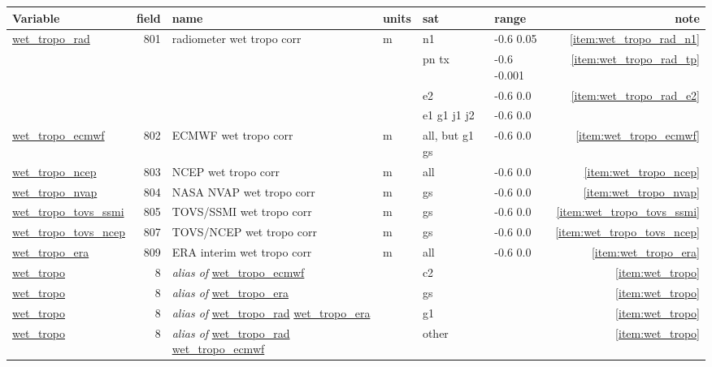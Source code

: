 \documentclass[a4paper,11pt,openany,natbib]{thesis}
\makeatletter
\newcommand\var[1]{\url{#1}\index{variables!#1@\protect\url{#1}}}
\newcommand\alias[1]{\emph{alias of} \var{#1}}
\newenvironment{vartable}{
\begin{table}[ht]
\small
\begin{tabular}{lrllllr}
\hline
Variable & field & name & units & sat & range & note \\
\hline
}{
\hline
\end{tabular}
\end{table}
}
\makeatother
\begin{document}
\begin{vartable}
\var{wet_tropo_rad} & 801 & radiometer wet tropo corr & m & n1 & -0.6 0.05 & \ref{item:wet_tropo_rad_n1} \\
                    &     &                           &   & pn tx & -0.6 -0.001 & \ref{item:wet_tropo_rad_tp} \\
                    &     &                           &   & e2 & -0.6 0.0 & \ref{item:wet_tropo_rad_e2} \\
                    &     &                           &   & e1 g1 j1 j2 & -0.6 0.0 & \\
\var{wet_tropo_ecmwf} & 802 & ECMWF wet tropo corr    & m & all, but g1 gs & -0.6 0.0 & \ref{item:wet_tropo_ecmwf} \\
\var{wet_tropo_ncep} & 803 & NCEP wet tropo corr      & m & all & -0.6 0.0 & \ref{item:wet_tropo_ncep} \\
\var{wet_tropo_nvap} & 804 & NASA NVAP wet tropo corr & m & gs & -0.6 0.0 & \ref{item:wet_tropo_nvap} \\
\var{wet_tropo_tovs_ssmi} & 805 & TOVS/SSMI wet tropo corr & m & gs & -0.6 0.0 & \ref{item:wet_tropo_tovs_ssmi} \\
\var{wet_tropo_tovs_ncep} & 807 & TOVS/NCEP wet tropo corr & m & gs & -0.6 0.0 & \ref{item:wet_tropo_tovs_ncep} \\
\var{wet_tropo_era} & 809 & ERA interim wet tropo corr & m & all & -0.6 0.0 & \ref{item:wet_tropo_era} \\
\hline
\var{wet_tropo} & 8 & \alias{wet_tropo_ecmwf} & & c2 & & \ref{item:wet_tropo} \\
\var{wet_tropo} & 8 & \alias{wet_tropo_era} & & gs & & \ref{item:wet_tropo} \\
\var{wet_tropo} & 8 & \alias{wet_tropo_rad} \var{wet_tropo_era} & & g1 & & \ref{item:wet_tropo} \\
\var{wet_tropo} & 8 & \alias{wet_tropo_rad} \var{wet_tropo_ecmwf} & & other & & \ref{item:wet_tropo} \\
\end{vartable}
\end{document}
